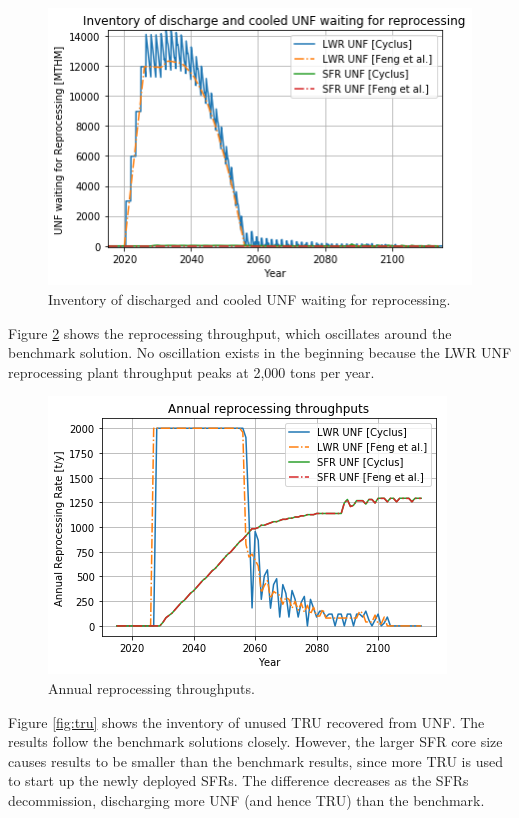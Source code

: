 \begin{figure}[htbp!]
    \begin{center}
        \includegraphics[scale=0.5]{./images/results_18/waiting_monthly.png}
    \end{center}
        \caption{Inventory of discharged and cooled \gls{UNF} waiting for reprocessing.}
    \label{fig:waiting_monthly}
\end{figure}


Figure \ref{fig:rep} shows the reprocessing throughput, which oscillates around
the benchmark solution. No oscillation exists in the beginning because the
\gls{LWR} \gls{UNF} reprocessing plant throughput peaks at 2,000 tons per year.

\begin{figure}[htbp!]
    \begin{center}
        \includegraphics[scale=0.5]{./images/results_18/rep.png}
    \end{center}
        \caption{Annual reprocessing throughputs.}
    \label{fig:rep}
\end{figure}


Figure \ref{fig:tru} shows the inventory of unused \gls{TRU} recovered from \gls{UNF}.
The \Cyclus results follow the benchmark solutions closely. However,
the larger \gls{SFR} core size causes \Cyclus results to be smaller than the benchmark results,
since more \gls{TRU} is used to
start up the newly deployed \glspl{SFR}. The difference decreases as the
\glspl{SFR} decommission, discharging more \gls{UNF} (and hence \gls{TRU}) than
the benchmark.

